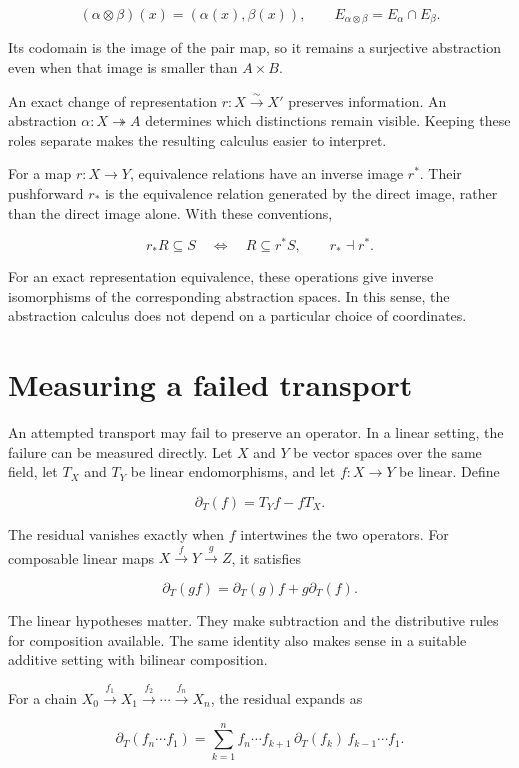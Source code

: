 \documentclass[11pt,oneside,openany]{book}
\begin{document}
\[
(\alpha\otimes\beta)(x)=(\alpha(x),\beta(x)),
\qquad
E_{\alpha\otimes\beta}=E_\alpha\cap E_\beta.
\]

Its codomain is the image of the pair map, so it remains a surjective abstraction even when that image is smaller than \(A\times B\).

An exact change of representation \(r:X\xrightarrow{\sim}X'\) preserves information. An abstraction \(\alpha:X\twoheadrightarrow A\) determines which distinctions remain visible. Keeping these roles separate makes the resulting calculus easier to interpret.

For a map \(r:X\longrightarrow Y\), equivalence relations have an inverse image \(r^*\). Their pushforward \(r_*\) is the equivalence relation generated by the direct image, rather than the direct image alone. With these conventions,

\[
r_*R\subseteq S\quad\Longleftrightarrow\quad R\subseteq r^*S,
\qquad r_*\dashv r^*.
\]

For an exact representation equivalence, these operations give inverse isomorphisms of the corresponding abstraction spaces. In this sense, the abstraction calculus does not depend on a particular choice of coordinates.

\section{Measuring a failed transport}
An attempted transport may fail to preserve an operator. In a linear setting, the failure can be measured directly. Let \(X\) and \(Y\) be vector spaces over the same field, let \(T_X\) and \(T_Y\) be linear endomorphisms, and let \(f:X\longrightarrow Y\) be linear. Define

\[
\partial_T(f)=T_Yf-fT_X.
\]

The residual vanishes exactly when \(f\) intertwines the two operators. For composable linear maps \(X\xrightarrow{f}Y\xrightarrow{g}Z\), it satisfies

\[
\partial_T(gf)=\partial_T(g)f+g\partial_T(f).
\]

The linear hypotheses matter. They make subtraction and the distributive rules for composition available. The same identity also makes sense in a suitable additive setting with bilinear composition.

For a chain \(X_0\xrightarrow{f_1}X_1\xrightarrow{f_2}\cdots\xrightarrow{f_n}X_n\), the residual expands as

\[
\partial_T(f_n\cdots f_1)
=\sum_{k=1}^{n}
f_n\cdots f_{k+1}\,\partial_T(f_k)\,f_{k-1}\cdots f_1.
\]
\end{document}
